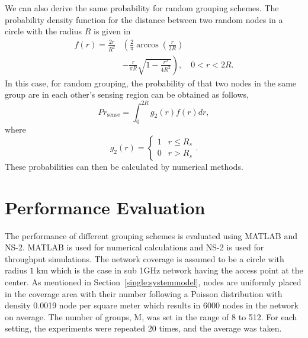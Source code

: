 We can also derive the same probability for random grouping schemes. The probability density function for the distance between two random nodes in a circle with the radius $R$ is given in \cite{moltchanov2012distance}
\begin{equation}
\begin{split}
f(r)=\frac{2r}{R^2} & \left( \frac{2}{\pi}\arccos(\frac{r}{2R}) \right. \\
& \left.  - \frac{r}{\pi R} \sqrt{1- \frac{r^2}{4R^2}} \right ) ,\quad 0<r<2R.
\end{split}
\end{equation}
In this case, for random grouping, the probability of that two nodes in the same group are in each other's sensing region can be obtained as follows,
\begin{equation}
Pr_{\text{sense}}=\int_0^{2R}g_2(r)f(r)dr,
\end{equation}
where
\begin{equation}
g_2(r)=
\begin{cases} 
      1 & r \leq R_s \\
      0 & r > R_s
   \end{cases}.
\end{equation}
These probabilities can then be calculated by numerical methods.




\section{Performance Evaluation}
\label{single:evaluation}

The performance of different grouping schemes is evaluated using MATLAB and NS-2\cite{breslau2000advances}. MATLAB is used for numerical calculations and NS-2 is used for throughput simulations. The network coverage is assumed to be a circle with radius $1$ km which is the case in sub 1GHz network having the access point at the center. As mentioned in Section~\ref{single:systemmodel}, nodes are uniformly placed in the coverage area with their number following a Poisson distribution with density 0.0019 node per square meter which results in 6000 nodes in the network on average. The number of groups, M, was set in the range of 8 to 512. For each setting, the experiments were repeated 20 times, and the average was taken. 


